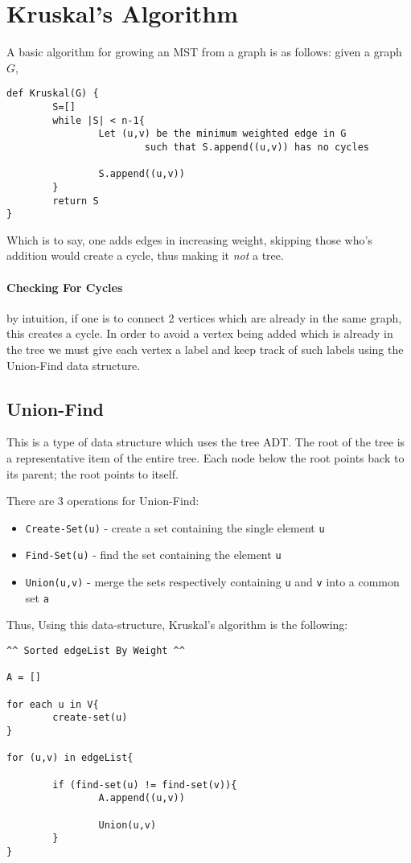 \documentclass[12pt]{book}
\begin{document}
\section*{Kruskal's Algorithm}
A basic algorithm for growing an MST from a graph is as follows: given
a graph $G$,
\begin{verbatim}
def Kruskal(G) {
        S=[]
        while |S| < n-1{
                Let (u,v) be the minimum weighted edge in G
                        such that S.append((u,v)) has no cycles

                S.append((u,v))
        }
        return S
}
\end{verbatim}

Which is to say, one adds edges in increasing weight, skipping those who's
addition would create a cycle, thus making it \textit{not} a tree.

\paragraph{Checking For Cycles}
by intuition, if one is to connect 2 vertices which are already in the same 
graph, this creates a cycle. In order to avoid a vertex being added which is
already in the tree we must give each vertex a label and keep track of such
labels using the Union-Find data structure.

\subsection*{Union-Find}
This is a type of data structure which uses the tree ADT. The root of
the tree is a representative item of the entire tree. Each node below
the root points back to its parent; the root points to itself.

There are 3 operations for Union-Find:
\begin{itemize}
        \item \texttt{Create-Set(u)} - create a set containing the single
                element \texttt{u}
        \item \texttt{Find-Set(u)} - find the set containing the element
                \texttt{u}
        \item \texttt{Union(u,v)} - merge the sets respectively 
                containing \texttt{u} and \texttt{v} into a common
                set \texttt{a}
\end{itemize}

Thus, Using this data-structure, Kruskal's algorithm is the following:
\begin{verbatim}
^^ Sorted edgeList By Weight ^^

A = []

for each u in V{
        create-set(u)
}

for (u,v) in edgeList{

        if (find-set(u) != find-set(v)){
                A.append((u,v))

                Union(u,v)
        }
}
\end{verbatim}
\end{document}
